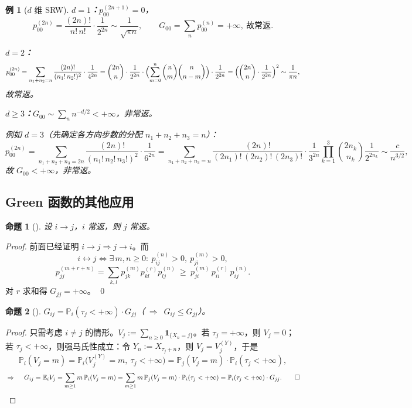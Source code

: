 \documentclass[lang=cn,10pt,newtx,thmcnt=chapter,mode=simple]{vividbook}
\providecommand{\E}{}\renewcommand{\E}{\mathbb{E}}
\providecommand{\Pp}{}\renewcommand{\Pp}{\mathbb{P}}
\newcommand{\ind}[1]{\mathbf{1}_{\{#1\}}}
\newcommand{\darr}{\;\Rightarrow\;}
\newcommand{\reach}{\to}
\newcommand{\comm}{\leftrightarrow}
\theoremstyle{vividthm}
\newtheorem*{vividproposition}{命题}
\theoremstyle{vividdef}
\theoremstyle{vividexa}
\newtheorem*{vividexample}{例}
\theoremstyle{vividrem}
\renewenvironment{proposition}[1][]{\begin{vividproposition}[#1]}{\end{vividproposition}}
\newenvironment{example}[1][]{\begin{vividexample}[#1]}{\end{vividexample}}
\begin{document}
\begin{example}[$d$ 维 SRW]
\textbf{$d=1$：}$p_{00}^{(2n+1)}=0$，
\[
p_{00}^{(2n)}=\frac{(2n)!}{n!\,n!}\cdot\frac{1}{2^{2n}}\sim\frac{1}{\sqrt{\pi n}},
\qquad
G_{00}=\sum_n p_{00}^{(n)}=+\infty,\ \text{故常返}.
\]

\textbf{$d=2$：}
\[
p_{00}^{(2n)}=\sum_{n_1+n_2=n}\frac{(2n)!}{(n_1!\,n_2!)^2}\cdot\frac{1}{4^{2n}}
=\binom{2n}{n}\cdot\frac{1}{2^{2n}}\cdot
\Bigl(\sum_{m=0}^{n}\binom{n}{m}\binom{n}{n-m}\Bigr)\cdot\frac{1}{2^{2n}}
=\Bigl(\binom{2n}{n}\cdot\frac{1}{2^{2n}}\Bigr)^{2}
\sim\frac{1}{\pi n},
\]
故常返。

\textbf{$d\ge3$：}$G_{00}\sim\sum_n n^{-d/2}<+\infty$，非常返。

例如 $d=3$（先确定各方向步数的分配 $n_1+n_2+n_3=n$）：
\[
p_{00}^{(2n)}=\sum_{n_1+n_2+n_3=2n}\frac{(2n)!}{(n_1!\,n_2!\,n_3!)^2}\cdot\frac{1}{6^{2n}}
=\sum_{n_1+n_2+n_3=n}\frac{(2n)!}{(2n_1)!\,(2n_2)!\,(2n_3)!}\cdot\frac{1}{3^{2n}}
\prod_{k=1}^{3}\binom{2n_k}{n_k}\frac{1}{2^{2n_k}}
\sim \frac{c}{n^{3/2}},
\]
故 $G_{00}<+\infty$，非常返。
\end{example}

\subsection{Green 函数的其他应用}

\begin{proposition}
设 $i\reach j$，$i$ 常返，则 $j$ 常返。
\end{proposition}

\begin{proof}
前面已经证明 $i\reach j\Rightarrow j\reach i$。而
\[
i\comm j\iff \exists\,m,n\ge0:\ p_{ij}^{(n)}>0,\ p_{ji}^{(m)}>0,
\]
\[
p_{jj}^{(m+r+n)}=\sum_{k,l}p_{jk}^{(m)}p_{kl}^{(r)}p_{lj}^{(n)}
\ \ge\ p_{ji}^{(m)}\,p_{ii}^{(r)}\,p_{ij}^{(n)} .
\]
对 $r$ 求和得 $G_{jj}=+\infty$。 \qed
\end{proof}

\begin{proposition}
$G_{ij}=\Pp_i(\tau_j<+\infty)\cdot G_{jj}$\quad（$\darr\ G_{ij}\le G_{jj}$）。
\end{proposition}

\begin{proof}
只需考虑 $i\ne j$ 的情形。$V_j:=\sum_{n\ge0}\ind{X_n=j}$。若 $\tau_j=+\infty$，则 $V_j=0$；
若 $\tau_j<+\infty$，则强马氏性成立：令 $Y_n:=X_{\tau_j+n}$，则 $V_j=V_j^{(Y)}$，于是
\[
\Pp_i(V_j=m)=\Pp_i\bigl(V_j^{(Y)}=m,\ \tau_j<+\infty\bigr)
=\Pp_j(V_j=m)\cdot\Pp_i(\tau_j<+\infty),
\]
\[
\darr\quad
G_{ij}=\E_iV_j=\sum_{m\ge1}m\,\Pp_i(V_j=m)
=\sum_{m\ge1}m\,\Pp_j(V_j=m)\cdot\Pp_i(\tau_j<+\infty)
=\Pp_i(\tau_j<+\infty)\cdot G_{jj}. \qed
\]
\end{proof}
\end{document}
